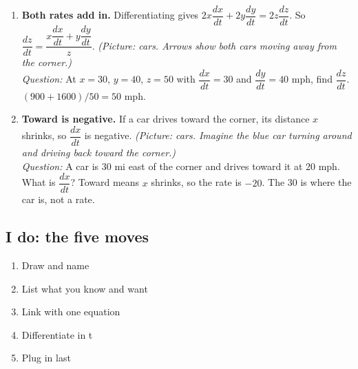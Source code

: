 \documentclass[11pt]{article}
\begin{document}
\begin{enumerate}
\item \textbf{Both rates add in.} Differentiating gives $2x\dfrac{dx}{dt}+2y\dfrac{dy}{dt}=2z\dfrac{dz}{dt}$. So $\dfrac{dz}{dt}=\dfrac{x\dfrac{dx}{dt}+y\dfrac{dy}{dt}}{z}$. \textit{(Picture: cars. Arrows show both cars moving away from the corner.)}\\ \textit{Question:} At $x=30$, $y=40$, $z=50$ with $\dfrac{dx}{dt}=30$ and $\dfrac{dy}{dt}=40$ mph, find $\dfrac{dz}{dt}$.  $(900+1600)/50=50$ mph.
\item \textbf{Toward is negative.} If a car drives toward the corner, its distance $x$ shrinks, so $\dfrac{dx}{dt}$ is negative. \textit{(Picture: cars. Imagine the blue car turning around and driving back toward the corner.)}\\ \textit{Question:} A car is 30 mi east of the corner and drives toward it at 20 mph. What is $\dfrac{dx}{dt}$?  Toward means $x$ shrinks, so the rate is $-20$. The 30 is where the car is, not a rate.
\end{enumerate}
\subsection*{I do: the five moves}\begin{enumerate}\item Draw and name
\item List what you know and want
\item Link with one equation
\item Differentiate in t
\item Plug in last\end{enumerate}
\end{document}
